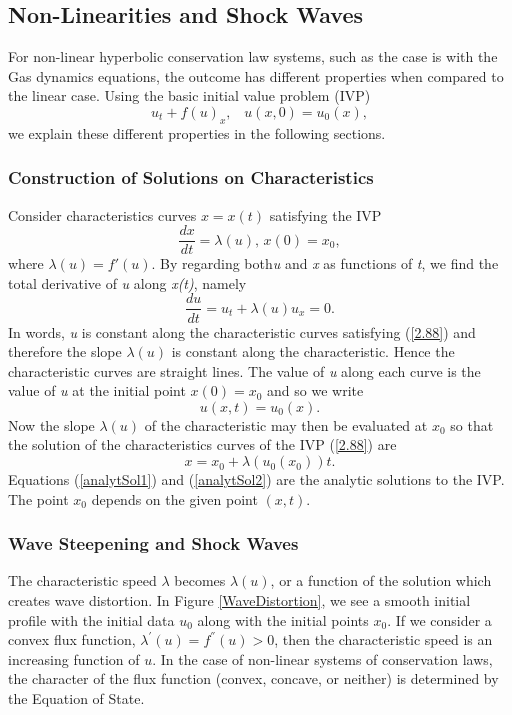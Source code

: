 \documentclass[]{article}
\begin{document}
	\subsection{Non-Linearities and Shock Waves}
		For non-linear hyperbolic conservation law systems, such as the case is with the Gas dynamics equations, the outcome has different properties when compared to the linear case. Using the basic initial value problem (IVP)
		\begin{equation}
			u_t + f(u)_x  \mbox{, } \mbox{  }u(x,0) = u_0(x),
			\label{IVP1}
		\end{equation} we explain these different properties in the following sections.
	
		\subsubsection{Construction of Solutions on Characteristics}
			Consider characteristics curves $ x = x(t) $ satisfying the IVP
			\begin{equation}
				\frac{dx}{dt} = \lambda(u) \mbox{, } x(0) = x_0,
				\label{2.88}
			\end{equation}
			where $ \lambda(u) = f'(u) $. By regarding both\textit{u} and \textit{x} as functions of \textit{t}, we find the total derivative  of \textit{u} along \textit{x(t)}, namely
			\begin{equation}
				\frac{du}{dt} = u_t + \lambda(u)u_x = 0.
			\end{equation}	
			In words, \textit{u} is constant along the characteristic curves satisfying (\ref{2.88}) and therefore the slope $ \lambda(u) $ is constant along the characteristic. Hence the characteristic curves are straight lines. The value of \textit{u} along each curve is the value of \textit{u} at the initial point $ x(0) = x_0 $ and so we write
			\begin{equation}
				u(x,t) = u_0(x).
				\label{analytSol1}
			\end{equation}
			Now the slope $ \lambda(u) $ of the characteristic may then be evaluated at $ x_0 $ so that the solution of the characteristics curves of the IVP (\ref{2.88}) are
			\begin{equation}
				x = x_0 + \lambda(u_0(x_0))t.
				\label{analytSol2}
			\end{equation}
			Equations (\ref{analytSol1}) and (\ref{analytSol2}) are the analytic solutions to the IVP. The point $ x_0 $ depends on the given point $ (x,t) $.
				
		\subsubsection{Wave Steepening and Shock Waves}
			The characteristic speed $ \lambda $ becomes $ \lambda(u) $, or a function of the solution which creates wave distortion. In Figure \ref{WaveDistortion}, we see a smooth initial profile with the initial data $ u_0 $ along with the initial points $ x_0 $. If we consider a convex flux function, $ \lambda^{'}(u) = f^{''}(u) > 0 $, then the characteristic speed  is an increasing function of $ u $. In the case of non-linear systems of conservation laws, the character of the flux function (convex, concave, or neither) is determined by the Equation of State.
	 
\end{document}
